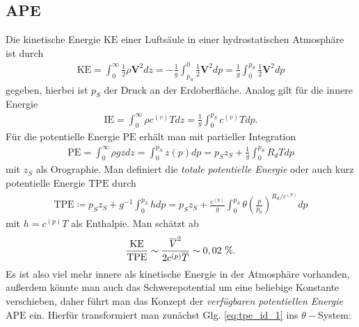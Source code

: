 \documentclass{book}
\newcommand\newoverline[1]{%
\overline{#1}}
\newcommand{\PE}{\text{PE}}
\newcommand{\KE}{\text{KE}}
\newcommand{\IE}{\text{IE}}
\newcommand{\TPE}{\text{TPE}}
\newcommand{\APE}{\text{APE}}
\begin{document}
\subsection{APE}
\label{sec:ape}

Die kinetische Energie $\KE$ einer Luftsäule in einer hydrostatischen Atmosphäre ist durch
%
\begin{eqnarray}
\KE = \int_0^{\infty}\frac{1}{2}\rho\mathbf{V}^2dz = -\frac{1}{g}\int_{p_S}^0\frac{1}{2}\mathbf{V}^2dp = \frac{1}{g}\int_0^{p_S}\frac{1}{2}\mathbf{V}^2dp
\end{eqnarray}
%
gegeben, hierbei ist $p_S$ der Druck an der Erdoberfläche. Analog gilt für die innere Energie
%
\begin{eqnarray}
\IE = \int_0^\infty\rho c^{(v)}Tdz = \frac{1}{g}\int_{0}^{p_S}c^{(v)}Tdp.
\end{eqnarray}
%
Für die potentielle Energie $\PE$ erhält man mit partieller Integration
%
\begin{eqnarray}
\PE = \int_0^\infty\rho gzdz = \int_0^{p_S}z\left(p\right)dp = p_Sz_S + \frac{1}{g}\int_0^{p_S}R_dTdp
\end{eqnarray}
%
mit $z_S$ als Orographie. Man definiert die \textit{totale potentielle Energie} oder auch kurz potentielle Energie $\TPE$ durch
%
\begin{eqnarray}
\TPE \coloneqq p_Sz_S + g^{-1}\int_0^{p_S}hdp = p_Sz_S + \frac{c^{(p)}}{g}\int_0^{p_S}\theta\left(\frac{p}{p_0}\right)^{R_d/c^{(p)}}dp\label{eq:tpe_id_1}
\end{eqnarray}
%
mit $h = c^{(p)}T$ als Enthalpie. Man schätzt ab
%
\begin{eqnarray}
\frac{\KE}{\TPE} \sim \frac{\newoverline{V}^2}{2c^{(p)}\newoverline{T}} \sim 0, 02\text{ \%}.
\end{eqnarray}
%
Es ist also viel mehr innere als kinetische Energie in der Atmosphäre vorhanden, außerdem könnte man auch das Schwerepotential um eine beliebige Konstante verschieben, daher führt man das Konzept der \textit{verfügbaren potentiellen Energie} $\APE$ ein. Hierfür transformiert man zunächst Glg. \eqref{eq:tpe_id_1} ins $\theta-$System:
\end{document}
